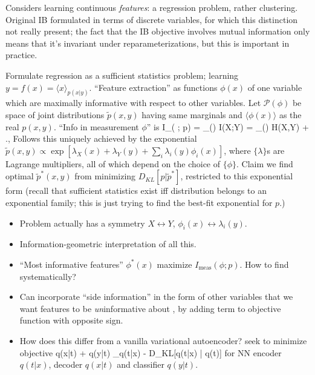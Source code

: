 \documentclass[notitlepage,openany,11pt]{report}
\theoremstyle{plain}%
\numberwithin{equation}{section}
\begin{document}
Considers learning continuous \emph{features}: a regression problem, rather clustering. Original IB formulated in terms of discrete variables, for which this distinction not really present; the fact that the IB objective involves mutual information only means that it's invariant under reparameterizations, but this is important in practice.

Formulate regression as a sufficient statistics problem; learning $y = f(x) = \langle x \rangle_{p(x|y)}$. ``Feature extraction'' as functions $\phi(x)$ of one variable which are maximally informative with respect to other variables. Let $\mathcal{P}(\phi)$ be space of joint distributions $\widetilde{p}(x,y)$ having same marginals and $\langle \phi(x) \rangle$ as the real $p(x,y)$. ``Info in measurement $\phi$'' is 
\be
I_{}( \phi; p) = \min_{(\phi)} I(X;Y) = \max_{(\phi)} H(X,Y) + ., 
\ee
Follows this uniquely achieved by the exponential $\widetilde{p}(x,y) \propto \exp \left[\lambda_{X}(x) + \lambda_{Y}(y) + \sum_{i} \lambda_{i}(y) \phi_{i}(x)\right]$, where $\{\lambda\}$s are Lagrange multipliers, all of which depend on the choice of $\{\phi\}$. Claim we find optimal $\widetilde{p}^{\ast}(x,y)$ from minimizing $D_{KL}[p | \widetilde{p}^{\ast}]$, restricted to this exponential form (recall that sufficient statistics exist iff distribution belongs to an exponential family; this is just trying to find the best-fit exponential for $p$.)


\begin{itemize}
\item Problem actually has a symmetry $X \leftrightarrow Y$, $\phi_{i}(x) \leftrightarrow \lambda_{i}(y)$. 
\item Information-geometric interpretation of all this. 
\item ``Most informative features'' $\phi^{\ast}(x)$ maximize $I_{\text{meas}}( \phi; p)$. How to find systematically?
\item Can incorporate ``side information'' in the form of other variables that we want features to be \emph{un}informative about \cite{GlobersonEtAl:12}, by adding term to objective function with opposite sign.
\item How does this differ from a vanilla variational autoencoder? \cite{BanijamaliEtAl:18} seek to minimize objective 
\be
\langle \log q(x|t) + \log q(y|t) \rangle_{q(t|x)} - D_{KL}[q(t|x) | q(t)]
\ee
for NN encoder $q(t|x)$, decoder $q(x|t)$ and classifier $q(y|t)$.
\end{itemize}
\end{document}
